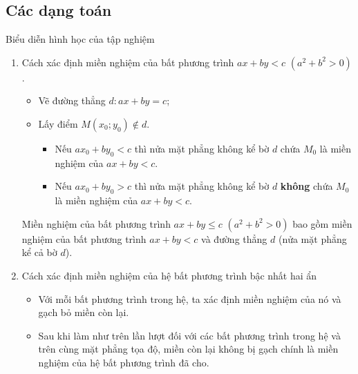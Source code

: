 \subsection{Các dạng toán}
\begin{dang}{Biểu diễn hình học của tập nghiệm}
	\begin{enumerate}
		\item Cách xác định miền nghiệm của bất phương trình $ax+by<c$ $\left(a^2+b^2>0\right)$.
		\begin{itemize}
			\item Vẽ đường thẳng $d:ax+by=c$;
			\item Lấy điểm $M\left(x_0;y_0\right)\notin d$.
			\begin{itemize}
				\item Nếu $ax_0 + by_0<c$ thì nửa mặt phẳng không kể bờ $d$ chứa $M_0$ là miền nghiệm của $ax + by<c$.
				\item Nếu $ax_0 + by_0>c$ thì nửa mặt phẳng không kể bờ $d$ \textbf{không} chứa $M_0$ là miền nghiệm của $ax + by< c$.
			\end{itemize}
		\end{itemize}
		
		\begin{note}
			Miền nghiệm của bất phương trình $ax + by\le c$ $\left(a^2+b^2>0\right)$ bao gồm miền nghiệm của bất phương trình $ax+by<c$ và đường thẳng $d$ (nửa mặt phẳng kể cả bờ $d$).
		\end{note}
		\item Cách xác định miền nghiệm của hệ bất phương trình bậc nhất hai ẩn
		\begin{itemize}
			\item Với mỗi bất phương trình trong hệ, ta xác định miền nghiệm của nó và gạch bỏ miền còn lại.
			\item Sau khi làm như trên lần lượt đối với các bất phương trình trong hệ và trên cùng mặt phẳng tọa độ, miền còn lại không bị gạch chính là miền nghiệm của hệ bất phương trình đã cho.
		\end{itemize}
	\end{enumerate}
\end{dang}

\viduminhhoa

